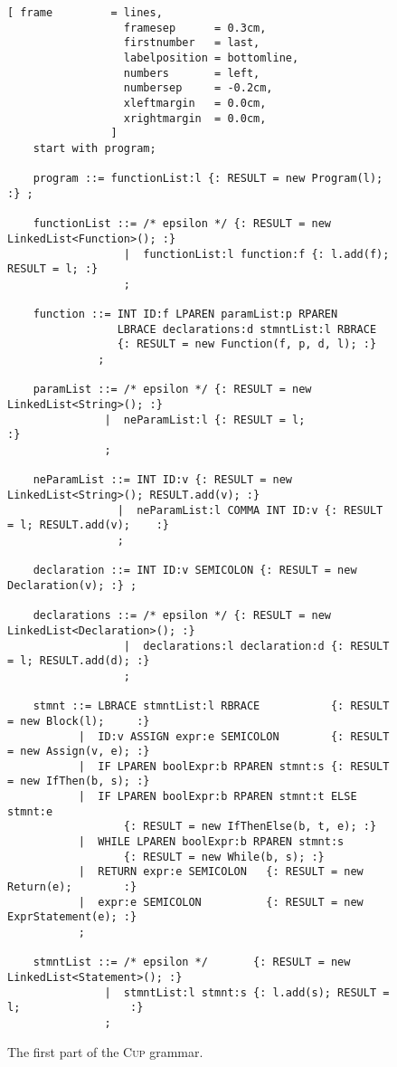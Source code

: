 \begin{figure}[!ht]
\centering
\begin{Verbatim}[ frame         = lines, 
                  framesep      = 0.3cm, 
                  firstnumber   = last,
                  labelposition = bottomline,
                  numbers       = left,
                  numbersep     = -0.2cm,
                  xleftmargin   = 0.0cm,
                  xrightmargin  = 0.0cm,
                ]
    start with program;
    
    program ::= functionList:l {: RESULT = new Program(l); :} ;
    
    functionList ::= /* epsilon */ {: RESULT = new LinkedList<Function>(); :}
                  |  functionList:l function:f {: l.add(f); RESULT = l; :}
                  ;
    
    function ::= INT ID:f LPAREN paramList:p RPAREN 
                 LBRACE declarations:d stmntList:l RBRACE
                 {: RESULT = new Function(f, p, d, l); :}
              ;
    
    paramList ::= /* epsilon */ {: RESULT = new LinkedList<String>(); :}
               |  neParamList:l {: RESULT = l;                        :}
               ;
    
    neParamList ::= INT ID:v {: RESULT = new LinkedList<String>(); RESULT.add(v); :}
                 |  neParamList:l COMMA INT ID:v {: RESULT = l; RESULT.add(v);    :}
                 ;           
    
    declaration ::= INT ID:v SEMICOLON {: RESULT = new Declaration(v); :} ;
    
    declarations ::= /* epsilon */ {: RESULT = new LinkedList<Declaration>(); :}
                  |  declarations:l declaration:d {: RESULT = l; RESULT.add(d); :}
                  ;
    
    stmnt ::= LBRACE stmntList:l RBRACE           {: RESULT = new Block(l);     :}
           |  ID:v ASSIGN expr:e SEMICOLON        {: RESULT = new Assign(v, e); :}
           |  IF LPAREN boolExpr:b RPAREN stmnt:s {: RESULT = new IfThen(b, s); :}        
           |  IF LPAREN boolExpr:b RPAREN stmnt:t ELSE stmnt:e
                  {: RESULT = new IfThenElse(b, t, e); :}
           |  WHILE LPAREN boolExpr:b RPAREN stmnt:s
                  {: RESULT = new While(b, s); :}
           |  RETURN expr:e SEMICOLON   {: RESULT = new Return(e);        :}
           |  expr:e SEMICOLON          {: RESULT = new ExprStatement(e); :}
           ;
    
    stmntList ::= /* epsilon */       {: RESULT = new LinkedList<Statement>(); :}
               |  stmntList:l stmnt:s {: l.add(s); RESULT = l;                 :}
               ;
\end{Verbatim}
\vspace*{-0.3cm}
\caption{The first part of the \textsc{Cup} grammar.}
\label{fig:compiler.cup-2}
\end{figure}


